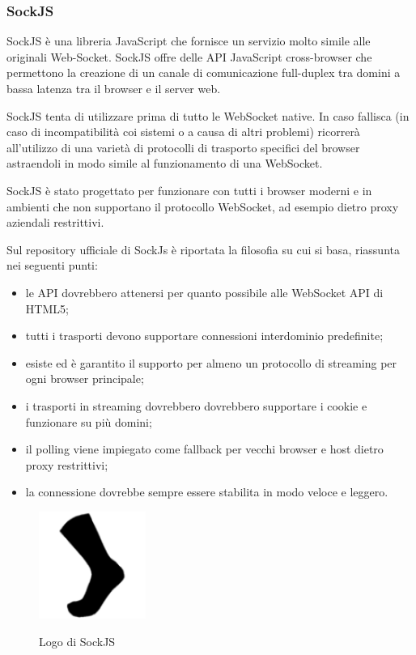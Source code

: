 \subsubsection{SockJS}
\noindent SockJS è una libreria JavaScript che fornisce un servizio molto simile alle originali Web-Socket. SockJS offre delle API JavaScript cross-browser che permettono la creazione di un canale di comunicazione full-duplex tra domini a bassa latenza tra il browser e il server web. \newline

\noindent SockJS tenta di utilizzare prima di tutto le WebSocket native. In caso fallisca (in caso di incompatibilità coi sistemi o a causa di altri problemi)
ricorrerà all'utilizzo di una varietà di protocolli di trasporto specifici del browser astraendoli in modo simile al funzionamento di una WebSocket. \newline

\noindent SockJS è stato progettato per funzionare con tutti i browser moderni e in ambienti che non
supportano il protocollo WebSocket, ad esempio dietro proxy aziendali restrittivi. ~\cite{GitHubso32:online} \newline

\noindent Sul repository ufficiale di SockJs è riportata la filosofia su cui si basa, riassunta nei seguenti punti:
\begin{itemize}
    \item le API dovrebbero attenersi per quanto possibile alle WebSocket API di HTML5;
    \item tutti i trasporti devono supportare connessioni interdominio predefinite;
    \item esiste ed è garantito il supporto per almeno un protocollo di streaming per ogni browser principale;
    \item i trasporti in streaming dovrebbero dovrebbero supportare i cookie e funzionare su più domini;
    \item il polling viene impiegato come fallback per vecchi browser e host dietro proxy restrittivi;
    \item la connessione dovrebbe sempre essere stabilita in modo veloce e leggero.
\end{itemize}


\begin{figure}[H]
    \caption{Logo di SockJS ~\cite{sockjsso96:online}}
    \centering
    \includegraphics[width=35mm]{img/logos/sockjs_logo.png}
    \label{fig:sockjs_logo}
\end{figure}


